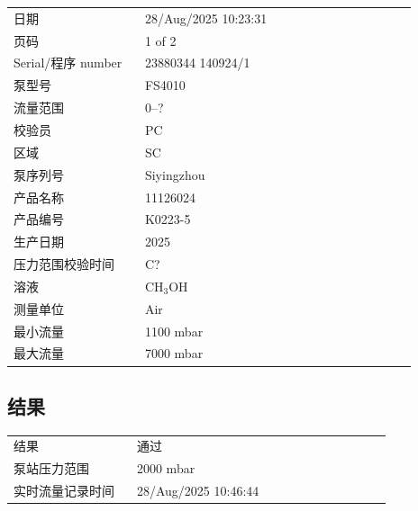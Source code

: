 \documentclass[UTF8,10pt,a4paper,fontset=fandol]{ctexart}
\newcommand{\fieldvalue}[1]{#1}
\begin{document}
\begin{tabular}{@{}p{0.30\linewidth}p{0.62\linewidth}@{}}
日期 &
\fieldvalue{28/Aug/2025 10:23:31}
\\
页码 &
\fieldvalue{1 of 2}
\\
Serial/程序 number &
\fieldvalue{23880344 140924/1}
\\
泵型号 &
\fieldvalue{FS4010}
\\
流量范围 &
\fieldvalue{0--?}
\\
校验员 &
\fieldvalue{PC}
\\
区域 &
\fieldvalue{SC}
\\
泵序列号 &
\fieldvalue{Siyingzhou}
\\
产品名称 &
\fieldvalue{11126024}
\\
产品编号 &
\fieldvalue{K0223-5}
\\
生产日期 &
\fieldvalue{2025}
\\
压力范围校验时间 &
\fieldvalue{C?}
\\
溶液 &
\fieldvalue{CH$_3$OH}
\\
测量单位 &
\fieldvalue{Air}
\\
最小流量 &
\fieldvalue{1100 mbar}
\\
最大流量 &
\fieldvalue{7000 mbar}
\end{tabular}

\vspace{1em}

\subsection*{结果}

\begin{tabular}{@{}p{0.30\linewidth}p{0.62\linewidth}@{}}
结果 &
\fieldvalue{通过}
\\
泵站压力范围 &
\fieldvalue{2000 mbar}
\\
实时流量记录时间 &
\fieldvalue{28/Aug/2025 10:46:44}
\end{tabular}
\end{document}
